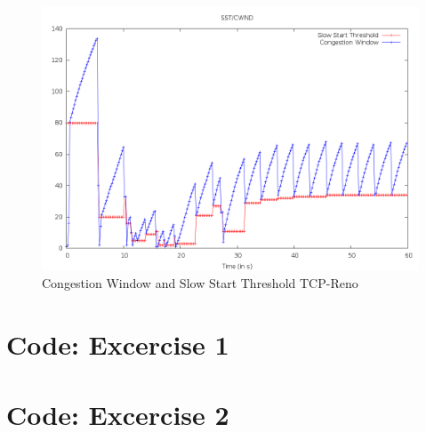 \documentclass[11pt,a4paper]{article}
\begin{document}
\begin{figure}[h!]
 \centering
 \includegraphics[width = 0.9\linewidth]{./ex2-part4.png}
 \caption{Congestion Window and Slow Start Threshold TCP-Reno}
 \label{fig:Q214}
\end{figure}

\newpage

\section{Code: Excercise 1}



\section{Code: Excercise 2}


\end{document}
